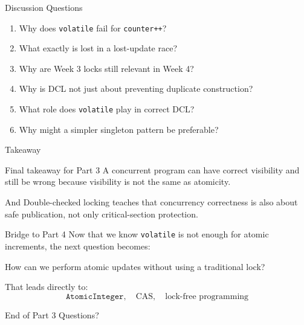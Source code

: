 \documentclass[aspectratio=169,11pt]{beamer}
\begin{document}
	\begin{frame}{Discussion Questions}
		\begin{enumerate}
			\item Why does \texttt{volatile} fail for \texttt{counter++}?
			\item What exactly is lost in a lost-update race?
			\item Why are Week 3 locks still relevant in Week 4?
			\item Why is DCL not just about preventing duplicate construction?
			\item What role does \texttt{volatile} play in correct DCL?
			\item Why might a simpler singleton pattern be preferable?
		\end{enumerate}
	\end{frame}
	
	\begin{frame}{Takeaway}
		\begin{alertblock}{Final takeaway for Part 3}
			A concurrent program can have correct visibility and still be wrong because visibility is not the same as atomicity.
		\end{alertblock}
		
		\vspace{0.35cm}
		
		\begin{block}{And}
			Double-checked locking teaches that concurrency correctness is also about safe publication, not only critical-section protection.
		\end{block}
		
		\vspace{0.35cm}
		
		\begin{exampleblock}{Bridge to Part 4}
			Now that we know \texttt{volatile} is not enough for atomic increments, the next question becomes:
			
			\begin{center}
				\Large
				How can we perform atomic updates without using a traditional lock?
			\end{center}
		\end{exampleblock}
		
		\vspace{0.2cm}
		
		That leads directly to:
		\[
		\texttt{AtomicInteger}, \quad \text{CAS}, \quad \text{lock-free programming}
		\]
	\end{frame}
	
	\begin{frame}{End of Part 3}
		\centering
		\Huge Questions?
	\end{frame}
	
\end{document}
